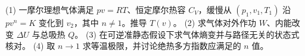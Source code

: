 (1) 一摩尔理想气体满足 \(pv=RT\)、恒定摩尔热容 \(C_V\)，缓慢从 \((p_1,v_1,T_1)\) 沿 \(pv^n=K\) 变化到 \(v_2\)，其中 \(n\ne1\)。推导 \(T(v)\)。
(2) 求气体对外作功 \(W\)、内能改变 \(\Delta U\) 与总吸热 \(Q\)。
(3) 在可逆准静态假设下求气体熵变并与路径无关的状态式核对。
(4) 取 \(n\to1\) 求等温极限，并讨论绝热多方指数应满足的 \(n\) 值。
